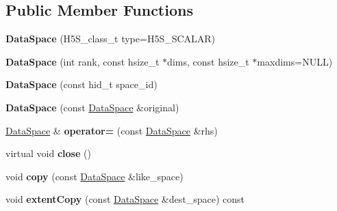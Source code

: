 \subsection*{Public Member Functions}
\begin{DoxyCompactItemize}
\item 
\mbox{\label{class_h5_1_1_data_space_ad56d9dd51af4ece3e7269404903bc4a9}} 
{\bfseries Data\+Space} (H5\+S\+\_\+class\+\_\+t type=H5\+S\+\_\+\+S\+C\+A\+L\+AR)
\item 
\mbox{\label{class_h5_1_1_data_space_a3147799b3cd1e741e591175e61785854}} 
{\bfseries Data\+Space} (int rank, const hsize\+\_\+t $\ast$dims, const hsize\+\_\+t $\ast$maxdims=N\+U\+LL)
\item 
\mbox{\label{class_h5_1_1_data_space_ab62bedbc7e8ced6a2adf71dbc7d143f7}} 
{\bfseries Data\+Space} (const hid\+\_\+t space\+\_\+id)
\item 
\mbox{\label{class_h5_1_1_data_space_a55be5c95c111878a78889697848c14cd}} 
{\bfseries Data\+Space} (const \hyperlink{class_h5_1_1_data_space}{Data\+Space} \&original)
\item 
\mbox{\label{class_h5_1_1_data_space_a5d4903a977821682bf7c97f13946bb94}} 
\hyperlink{class_h5_1_1_data_space}{Data\+Space} \& {\bfseries operator=} (const \hyperlink{class_h5_1_1_data_space}{Data\+Space} \&rhs)
\item 
\mbox{\label{class_h5_1_1_data_space_a505cabc7bc45e0010813bbeb0f565f60}} 
virtual void {\bfseries close} ()
\item 
\mbox{\label{class_h5_1_1_data_space_aec8ac009d4284d786c26e1f7a109e635}} 
void {\bfseries copy} (const \hyperlink{class_h5_1_1_data_space}{Data\+Space} \&like\+\_\+space)
\item 
\mbox{\label{class_h5_1_1_data_space_a6ed40f27cd9b9f3c588a3bbefe1c1ac2}} 
void {\bfseries extent\+Copy} (const \hyperlink{class_h5_1_1_data_space}{Data\+Space} \&dest\+\_\+space) const
\item 
\mbox{\label{class_h5_1_1_data_space_a6ed1e810bcaa5cc0cb1cd5b5e680608c}} 

\end{DoxyCompactItemize}
